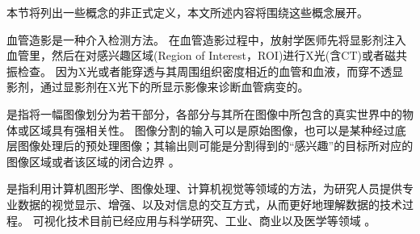 本节将列出一些概念的非正式定义，本文所述内容将围绕这些概念展开。


\begin{definition}[血管造影]
血管造影是一种介入检测方法。
在血管造影过程中，放射学医师先将显影剂注入血管里，然后在对感兴趣区域(Region of Interest，ROI)进行X光(含CT)或者磁共振检查。
因为X光或者能穿透与其周围组织密度相近的血管和血液，而穿不透显影剂，通过显影剂在X光下的所显示影像来诊断血管病变的。
\end{definition}

\begin{definition}[经皮介入血管成形术]
\end{definition}

\begin{definition}[图像分割]
是指将一幅图像划分为若干部分，各部分与其所在图像中所包含的真实世界中的物体或区域具有强相关性。
图像分割的输入可以是原始图像，也可以是某种经过底层图像处理后的预处理图像；其输出则可能是分割得到的“感兴趣”的目标所对应的图像区域或者该区域的闭合边界 \cite{Sonka2008ImageBook,Wang2008ImageBook}。%
\end{definition}

\begin{definition}[可视化]
是指利用计算机图形学、图像处理、计算机视觉等领域的方法，为研究人员提供专业数据的视觉显示、增强、以及对信息的交互方式，从而更好地理解数据的技术过程。
可视化技术目前已经应用与科学研究、工业、商业以及医学等领域 \cite{Hearn2004CGBook}。
\end{definition}


